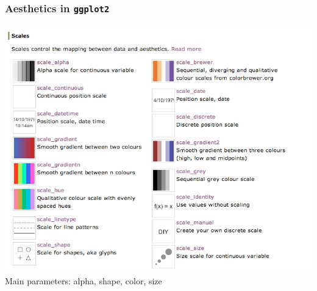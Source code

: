 \documentclass{beamer}\usepackage[]{graphicx}\usepackage[]{color}
\begin{document}
\begin{frame}
\frametitle{Aesthetics in \texttt{ggplot2}}
\hfil\includegraphics[width=.8\linewidth]{ggplot2aesthetics}\\
Main parameters: alpha, shape, color, size
\end{frame}
\end{document}
